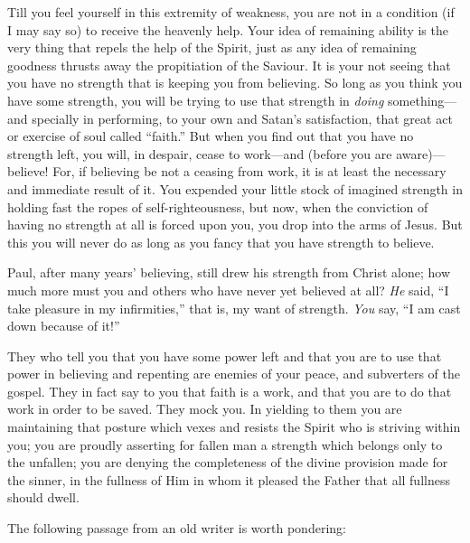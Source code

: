 \documentclass[
]{book}
\begin{document}
Till you feel yourself in this extremity of weakness, you are not in a condition (if I may say so) to receive the heavenly help. Your idea of remaining ability is the very thing that repels the help of the Spirit, just as any idea of remaining goodness thrusts away the propitiation of the Saviour. It is your not seeing that you have no strength that is keeping you from believing. So long as you think you have some strength, you will be trying to use that strength in \emph{doing} something---and specially in performing, to your own and Satan's satisfaction, that great act or exercise of soul called ``faith.'' But when you find out that you have no strength left, you will, in despair, cease to work---and (before you are aware)---believe! For, if believing be not a ceasing from work, it is at least the necessary and immediate result of it. You expended your little stock of imagined strength in holding fast the ropes of self-righteousness, but now, when the conviction of having no strength at all is forced upon you, you drop into the arms of Jesus. But this you will never do as long as you fancy that you have strength to believe.

Paul, after many years' believing, still drew his strength from Christ alone; how much more must you and others who have never yet believed at all? \emph{He} said, ``I take pleasure in my infirmities,'' that is, my want of strength. \emph{You} say, ``I am cast down because of it!''

They who tell you that you have some power left and that you are to use that power in believing and repenting are enemies of your peace, and subverters of the gospel. They in fact say to you that faith is a work, and that you are to do that work in order to be saved. They mock you. In yielding to them you are maintaining that posture which vexes and resists the Spirit who is striving within you; you are proudly asserting for fallen man a strength which belongs only to the unfallen; you are denying the completeness of the divine provision made for the sinner, in the fullness of Him in whom it pleased the Father that all fullness should dwell.

The following passage from an old writer is worth pondering:
\end{document}
